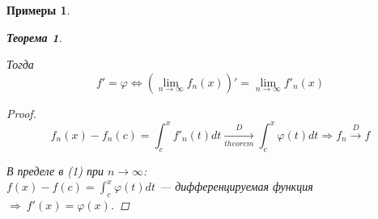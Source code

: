 \documentclass[a4paper, 12pt]{article}
\newtheorem{Examples}{Примеры}
\newtheorem{Thm}{Теорема}
\begin{document}
\begin{Examples}
\begin{enumerate}
\begin{Thm}
\begin{enumerate}
                    \end{enumerate}
                    Тогда
                    \[f' = \varphi
                    \Leftrightarrow (\lim_{n \rightarrow \infty} f_n(x))' =
                    \lim_{n \rightarrow \infty} f'_n(x)\]

                    \begin{proof}
                        \begin{equation*}
                            f_n(x) - f_n(c) = \int^{x}_{c} f'_n(t)dt
                            \underset{theorem}{\xrightarrow{D}}
                            \int^{x}_{c} \varphi(t)dt \Rightarrow f_n
                            \xrightarrow{D} f
                        \end{equation*}

                        В пределе в (1) при \(n \rightarrow \infty\):\\
                        \(f(x) - f(c) = \int^{x}_{c} \varphi(t)dt\) --- дифференцируемая функция
                        \( \Rightarrow\ f'(x) = \varphi(x)\).
                    \end{proof}
                \end{Thm}
         \end{enumerate}
    \end{Examples}
\end{document}
